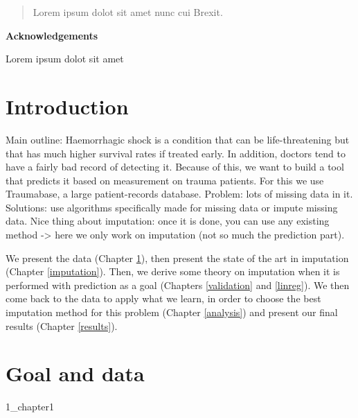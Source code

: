 \documentclass[12pt, a4paper]{memoir}
\begin{document}



\begin{vplace}[0.7]
\begin{abstract}
Lorem ipsum dolot sit amet nunc cui Brexit.
\end{abstract}
\end{vplace}

\newpage
\vspace*{\fill}
{\centering\huge\bfseries Acknowledgements\par}
\bigskip
\noindent Lorem ipsum dolot sit amet
\vspace*{\fill}
\newpage

\tableofcontents*
\vspace*{\fill}

\chapter*{Introduction}
Main outline: Haemorrhagic shock is a condition that can be life-threatening but that has much higher survival rates if treated early. In addition, doctors tend to have a fairly bad record of detecting it. Because of this, we want to build a tool that predicts it based on measurement on trauma patients. For this we use Traumabase, a large patient-records database. Problem: lots of missing data in it. Solutions: use algorithms specifically made for missing data or impute missing data. Nice thing about imputation: once it is done, you can use any existing method -> here we only work on imputation (not so much the prediction part).

We present the data (Chapter \ref{data}), then present the state of the art in imputation (Chapter \ref{imputation}). Then, we derive some theory on imputation when it is performed with prediction as a goal (Chapters \ref{validation} and \ref{linreg}). We then come back to the data to apply what we learn, in order to choose the best imputation method for this problem (Chapter \ref{analysis}) and present our final results (Chapter \ref{results}).

\chapter{Goal and data}
\label{data}
 {1_chapter1}
\end{document}
